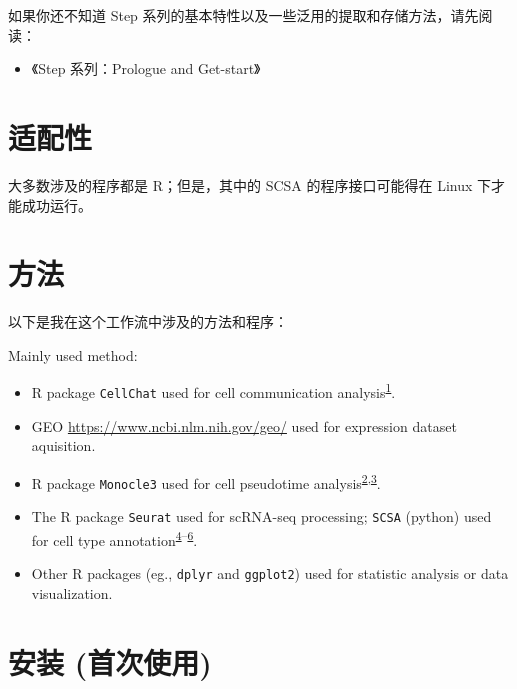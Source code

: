 \documentclass[
]{article}
\providecommand{\tightlist}{%
  \setlength{\itemsep}{0pt}\setlength{\parskip}{0pt}}
\begin{document}
如果你还不知道 Step 系列的基本特性以及一些泛用的提取和存储方法，请先阅读：

\begin{itemize}
\tightlist
\item
  《Step 系列：Prologue and Get-start》
\end{itemize}

\hypertarget{ux9002ux914dux6027}{%
\section{适配性}\label{ux9002ux914dux6027}}

大多数涉及的程序都是 R；但是，其中的 SCSA 的程序接口可能得在 Linux 下才能成功运行。

\hypertarget{ux65b9ux6cd5}{%
\section{方法}\label{ux65b9ux6cd5}}

以下是我在这个工作流中涉及的方法和程序：

Mainly used method:

\begin{itemize}
\tightlist
\item
  R package \texttt{CellChat} used for cell communication analysis\textsuperscript{\protect\hyperlink{ref-InferenceAndAJinS2021}{1}}.
\item
  GEO \url{https://www.ncbi.nlm.nih.gov/geo/} used for expression dataset aquisition.
\item
  R package \texttt{Monocle3} used for cell pseudotime analysis\textsuperscript{\protect\hyperlink{ref-ReversedGraphQiuX2017}{2},\protect\hyperlink{ref-TheDynamicsAnTrapne2014}{3}}.
\item
  The R package \texttt{Seurat} used for scRNA-seq processing; \texttt{SCSA} (python) used for cell type annotation\textsuperscript{\protect\hyperlink{ref-IntegratedAnalHaoY2021}{4}--\protect\hyperlink{ref-ScsaACellTyCaoY2020}{6}}.
\item
  Other R packages (eg., \texttt{dplyr} and \texttt{ggplot2}) used for statistic analysis or data visualization.
\end{itemize}

\hypertarget{ux5b89ux88c5-ux9996ux6b21ux4f7fux7528}{%
\section{安装 (首次使用)}\label{ux5b89ux88c5-ux9996ux6b21ux4f7fux7528}}
\end{document}
